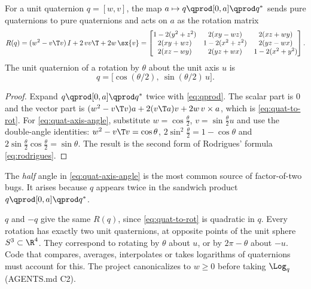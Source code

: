 \begin{theorem}
\label{thm:quat-rotation}
For a unit quaternion $q = [w, v]$, the map $a \mapsto q\qprod[0, a]\qprod q^*$ sends pure
quaternions to pure quaternions and acts on $a$ as the rotation matrix
\begin{equation}
  R(q) = (w^2 - v\T v)\,I + 2\,v v\T + 2w\,\sx{v}
  = \begin{bmatrix}
    1 - 2(y^2 + z^2) & 2(xy - wz) & 2(xz + wy) \\
    2(xy + wz) & 1 - 2(x^2 + z^2) & 2(yz - wx) \\
    2(xz - wy) & 2(yz + wx) & 1 - 2(x^2 + y^2)
  \end{bmatrix}.
  \label{eq:quat-to-rot}
\end{equation}
The unit quaternion of a rotation by $\theta$ about the unit axis $u$ is
\begin{equation}
  q = \big[\cos(\theta/2),\ \sin(\theta/2)\,u\big].
  \label{eq:quat-axis-angle}
\end{equation}
\end{theorem}
\begin{proof}
Expand $q\qprod[0, a]\qprod q^*$ twice with \eqref{eq:qprod}. The scalar part is $0$ and the vector part
is $(w^2 - v\T v)a + 2(v\T a)v + 2w\, v\times a$, which is \eqref{eq:quat-to-rot}. For
\eqref{eq:quat-axis-angle}, substitute $w = \cos\frac\theta2$, $v = \sin\frac\theta2 u$ and use the
double-angle identities: $w^2 - v\T v = \cos\theta$, $2\sin^2\frac\theta2 = 1 - \cos\theta$ and
$2\sin\frac\theta2\cos\frac\theta2 = \sin\theta$. The result is the second form of Rodrigues'
formula \eqref{eq:rodrigues}.
\end{proof}

The \emph{half} angle in \eqref{eq:quat-axis-angle} is the most common source of factor-of-two bugs. It
arises because $q$ appears twice in the sandwich product $q \qprod [0,a] \qprod q^*$.

\begin{keyidea}
$q$ and $-q$ give the same $R(q)$, since \eqref{eq:quat-to-rot} is quadratic in $q$. Every rotation
has exactly two unit quaternions, at opposite points of the unit sphere $S^3 \subset \R^4$. They
correspond to rotating by $\theta$ about $u$, or by $2\pi - \theta$ about $-u$. Code that compares,
averages, interpolates or takes logarithms of quaternions must account for this. The project
canonicalizes to $w \ge 0$ before taking $\Log_q$ (AGENTS.md C2).
\end{keyidea}

